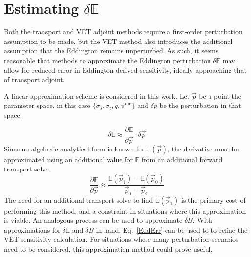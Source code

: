 \documentclass[12pt]{report}
\newcommand{\vp}{\vec{p}}
\newcommand{\Edd}{\mathbb{E}}
\newcommand{\BEdd}{B}
\begin{document}
\section{Estimating $\delta \Edd$}
Both the transport and VET adjoint methods require a first-order perturbation assumption to be made, but the VET method also introduces the additional assumption that the Eddington remains unperturbed. As such, it seems reasonable that methods to approximate the Eddington perturbation $\delta \Edd$ may allow for reduced error in Eddington derived sensitivity, ideally approaching that of transport adjoint. 

A linear approximation scheme is considered in this work. Let $\vp$ be a point the  parameter space, in this case $\lbrace \sigma_s , \sigma_t, q, \psi^{\text{inc}} \rbrace$ and $\delta p$ be the perturbation in that space.

\begin{equation}
\delta \Edd \approx \frac{\partial \Edd}{\partial \vp} \cdot \delta \vp
\end{equation}
Since no algebraic analytical form is known for $\Edd ( \vp )$, the derivative must be approximated using an additional value for $\Edd$ from an additional forward transport solve.
\begin{equation}
\label{Eddapprox}
\frac{\partial \Edd}{\partial \vp} \approx \frac{\Edd(\vp_1) - \Edd(\vp_0)}{\vp_1 - \vp_0}
\end{equation}
The need for an additional transport solve to find $\Edd(\vp_1)$ is the primary cost of performing this method, and a constraint in situations where this approximation is viable. An analogous process can be used to approximate $\delta \BEdd$. With approximations for $\delta \Edd$ and $\delta \BEdd$ in hand, Eq.~\eqref{EddErr} can be used to to refine the VET sensitivity calculation. For situations where many perturbation scenarios need to be considered, this approximation method could prove useful. 


\end{document}
